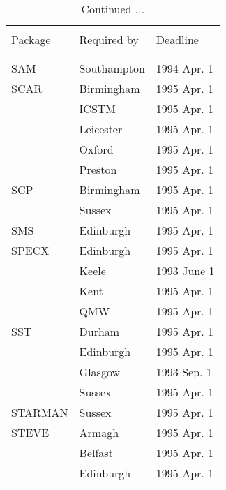 \addtocounter{table}{-1}
\begin{table}
\caption{Continued ...}
\vspace{5mm}
\begin{center}
\begin{tabular}{|p{36mm}|p{50mm}|p{30mm}|} \hline
& & \\
Package & Required by & Deadline \\
& & \\ \hline
& & \\
SAM                     & Southampton      & 1994 Apr. 1 \\
SCAR                    & Birmingham       & 1995 Apr. 1 \\
                        & ICSTM            & 1995 Apr. 1 \\
                        & Leicester        & 1995 Apr. 1 \\
                        & Oxford           & 1995 Apr. 1 \\
                        & Preston          & 1995 Apr. 1 \\
SCP                     & Birmingham       & 1995 Apr. 1 \\
                        & Sussex           & 1995 Apr. 1 \\
SMS                     & Edinburgh        & 1995 Apr. 1 \\
SPECX                   & Edinburgh        & 1995 Apr. 1 \\
                        & Keele            & 1993 June 1 \\
                        & Kent             & 1995 Apr. 1 \\
                        & QMW              & 1995 Apr. 1 \\
SST                     & Durham           & 1995 Apr. 1 \\
                        & Edinburgh        & 1995 Apr. 1 \\
                        & Glasgow          & 1993 Sep. 1 \\
                        & Sussex           & 1995 Apr. 1 \\
STARMAN                 & Sussex           & 1995 Apr. 1 \\
STEVE                   & Armagh           & 1995 Apr. 1 \\
                        & Belfast          & 1995 Apr. 1 \\
                        & Edinburgh        & 1995 Apr. 1 \\

\end{tabular}
\end{center}
\end{table}
